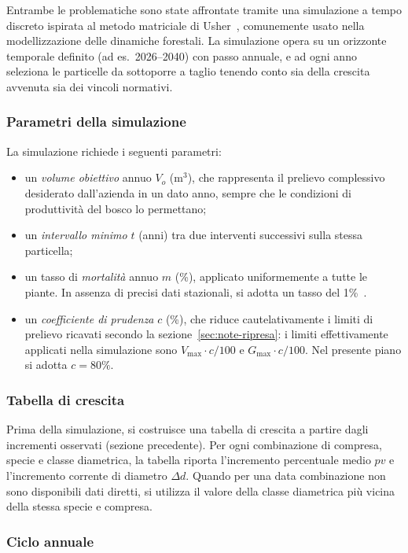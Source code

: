\documentclass[a4paper,11pt]{article}
\begin{document}
Entrambe le problematiche sono state affrontate tramite una simulazione a tempo discreto ispirata al metodo matriciale di Usher~\cite{usher:1966}, comunemente usato nella modellizzazione delle dinamiche forestali. La simulazione opera su un orizzonte temporale definito (ad es.\ 2026--2040) con passo annuale, e ad ogni anno seleziona le particelle da sottoporre a taglio tenendo conto sia della crescita avvenuta sia dei vincoli normativi.

\subsubsection{Parametri della simulazione}
\label{sec:note-parametri}

La simulazione richiede i seguenti parametri:
\begin{itemize}
\item un \emph{volume obiettivo} annuo $V_o$ (m$^3$), che rappresenta il prelievo complessivo desiderato dall'azienda in un dato anno, sempre che le condizioni di produttività del bosco lo permettano;
\item un \emph{intervallo minimo} $t$ (anni) tra due interventi successivi sulla stessa particella;
\item un tasso di \emph{mortalità} annuo $m$ (\%), applicato uniformemente a tutte le piante. In assenza di precisi dati stazionali, si adotta un tasso del 1\%~\cite{lacasia:2025}.
\item un \emph{coefficiente di prudenza} $c$ (\%), che riduce cautelativamente i limiti di prelievo ricavati secondo la sezione~\ref{sec:note-ripresa}: i limiti effettivamente applicati nella simulazione sono $V_{\max}\cdot c/100$ e $G_{\max}\cdot c/100$. Nel presente piano si adotta $c = 80\%$.
\end{itemize}

\subsubsection{Tabella di crescita}
Prima della simulazione, si costruisce una tabella di crescita a partire dagli incrementi osservati (sezione precedente). Per ogni combinazione di compresa, specie e classe diametrica, la tabella riporta l'incremento percentuale medio $pv$ e l'incremento corrente di diametro $\Delta d$. Quando per una data combinazione non sono disponibili dati diretti, si utilizza il valore della classe diametrica più vicina della stessa specie e compresa.

\subsubsection{Ciclo annuale}
\label{sec:note-ciclo}
\end{document}
